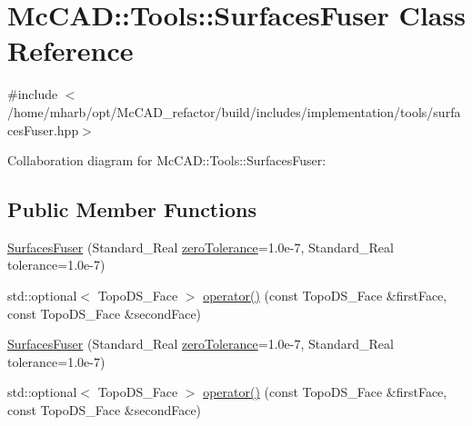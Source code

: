 \hypertarget{classMcCAD_1_1Tools_1_1SurfacesFuser}{}\section{Mc\+C\+AD\+:\+:Tools\+:\+:Surfaces\+Fuser Class Reference}
\label{classMcCAD_1_1Tools_1_1SurfacesFuser}


{\ttfamily \#include $<$/home/mharb/opt/\+Mc\+C\+A\+D\+\_\+refactor/build/includes/implementation/tools/surfaces\+Fuser.\+hpp$>$}



Collaboration diagram for Mc\+C\+AD\+:\+:Tools\+:\+:Surfaces\+Fuser\+:
\subsection*{Public Member Functions}
\begin{DoxyCompactItemize}
\item 
\hyperlink{classMcCAD_1_1Tools_1_1SurfacesFuser_a7e369e5001c4e14ccb690d61faa0018c}{Surfaces\+Fuser} (Standard\+\_\+\+Real \hyperlink{classMcCAD_1_1Tools_1_1SurfacesFuser_a7ff8c39d261160d8c0e81be599ce9835}{zero\+Tolerance}=1.\+0e-\/7, Standard\+\_\+\+Real tolerance=1.\+0e-\/7)
\item 
std\+::optional$<$ Topo\+D\+S\+\_\+\+Face $>$ \hyperlink{classMcCAD_1_1Tools_1_1SurfacesFuser_a82a8e6526205fbfd22dbb93e01f24994}{operator()} (const Topo\+D\+S\+\_\+\+Face \&first\+Face, const Topo\+D\+S\+\_\+\+Face \&second\+Face)
\item 
\hyperlink{classMcCAD_1_1Tools_1_1SurfacesFuser_a7e369e5001c4e14ccb690d61faa0018c}{Surfaces\+Fuser} (Standard\+\_\+\+Real \hyperlink{classMcCAD_1_1Tools_1_1SurfacesFuser_a7ff8c39d261160d8c0e81be599ce9835}{zero\+Tolerance}=1.\+0e-\/7, Standard\+\_\+\+Real tolerance=1.\+0e-\/7)
\item 
std\+::optional$<$ Topo\+D\+S\+\_\+\+Face $>$ \hyperlink{classMcCAD_1_1Tools_1_1SurfacesFuser_a474383c6856eeb901ff8f947c8dca9ed}{operator()} (const Topo\+D\+S\+\_\+\+Face \&first\+Face, const Topo\+D\+S\+\_\+\+Face \&second\+Face)
\end{DoxyCompactItemize}
